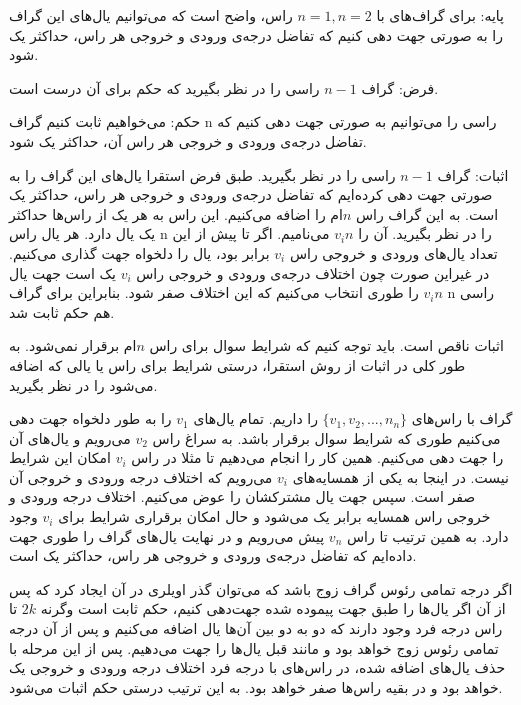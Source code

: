 \documentclass[11pt,largemargins]{h2wp}
\begin{document}
پایه: برای گراف‌های با $ n = 1 , n=2 $ راس، واضح است که می‌توانیم یال‌های این گراف را به صورتی جهت ‌دهی کنیم که تفاضل درجه‌ی ورودی و خروجی هر راس، حداکثر یک شود.

فرض: گراف $n-1 $ راسی را در نظر بگیرید که حکم برای آن درست است.

حکم: می‌خواهیم ثابت کنیم گراف n راسی را می‌توانیم به صورتی جهت ‌دهی کنیم که تفاضل درجه‌ی ورودی و خروجی هر راس آن، حداکثر یک شود. 
   
   اثبات: گراف $n-1 $ راسی را در نظر بگیرید. طبق فرض استقرا یال‌های این گراف را به صورتی جهت ‌دهی کرده‌ایم که تفاضل درجه‌ی ورودی و خروجی هر راس، حداکثر یک است. به این گراف راس $ n$ام را اضافه می‌کنیم. این راس به هر یک از راس‌ها حداکثر یک یال دارد.  هر یال راس n را در نظر بگیرید. آن را $v_in$ می‌نامیم. اگر تا پیش از این تعداد یال‌های ورودی و خروجی راس $v_i$ برابر بود، یال را دلخواه جهت گذاری می‌کنیم. در غیراین صورت چون اختلاف درجه‌ی ورودی و خروجی راس $v_i$ یک است جهت یال $v_in$ را طوری انتخاب می‌کنیم که این اختلاف صفر شود.
 بنابراین برای گراف n راسی هم حکم ثابت شد.  
   \notes
   
   اثبات ناقص است. باید توجه کنیم که شرایط سوال برای راس $ n$ام برقرار نمی‌شود. به طور کلی در اثبات از روش استقرا، درستی شرایط برای راس یا یالی که اضافه می‌شود را در نظر بگیرید.
     
    \solution
    گراف با راس‌های $\{ v_1, v_2, ... , n_n \}$ را داریم. تمام یال‌های $v_1 $ را به طور دلخواه جهت دهی می‌کنیم طوری که شرایط سوال برقرار باشد. به سراغ راس
     $ v_2 $  
    می‌رویم و یال‌های آن را جهت دهی می‌کنیم. همین کار را انجام می‌دهیم تا مثلا در راس $v_i$ امکان این شرایط نیست. در اینجا به یکی از همسایه‌های  $v_i$ می‌رویم که اختلاف درجه ورودی و خروجی آن صفر است. سپس جهت یال مشترکشان را عوض می‌کنیم. اختلاف درجه ورودی و خروجی راس همسایه برابر یک می‌شود و حال امکان برقراری شرایط برای $v_i$ وجود دارد. به همین ترتیب تا راس $ v_n $ پیش می‌رویم و در نهایت یال‌های گراف را طوری جهت داده‌ایم که تفاضل درجه‌ی ورودی و خروجی هر راس، حداکثر یک است.
    
    \notes
    
        
    
    اگر درجه تمامی رئوس گراف زوج باشد که می‌توان گذر اویلری در آن ایجاد کرد که پس از آن اگر یال‌ها را طبق جهت پیموده شده جهت‌دهی کنیم، حکم ثابت است وگرنه $2k$ تا راس درجه فرد وجود دارند که دو به دو بین آن‌ها یال اضافه می‌کنیم و پس از آن درجه تمامی رئوس زوج خواهد بود و مانند قبل یال‌ها را جهت می‌دهیم. پس از این مرحله با حذف یال‌های اضافه شده، در راس‌های با درجه فرد اختلاف درجه ورودی و خروجی یک خواهد بود و در بقیه راس‌ها صفر خواهد بود. به این ترتیب درستی حکم اثبات می‌شود.
    

 
\end{document}
